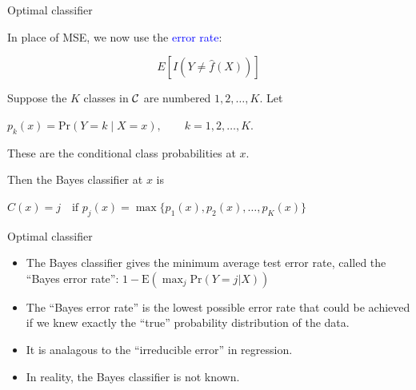 \documentclass[14pt]{beamer}
\begin{document}
\begin{frame}{Optimal classifier}

In place of MSE, we now use the \textcolor{blue}{error rate}:
\begin{block}{}
$$ E[I(Y \ne \hat{f}(X))] $$
\end{block} \pause
Suppose the $K$ classes in $\cal C$ are
numbered $1, 2, \dots, K$. Let
\begin{block}{}
\centerline{$
p_k(x) = \text{Pr}(Y = k\mid X = x),\qquad k = 1, 2, \dots , K.
$}
\end{block}
These are the \alert{conditional class probabilities} at $x$. \pause


Then the \alert{Bayes classifier} at $x$ is
\begin{block}{}
\centerline{$
C(x) = j\quad \text{if $p_j(x) = \max\{p_1(x), p_2(x), \dots, p_K(x)\}$}
$}
\end{block}

\end{frame}

\begin{frame}{Optimal classifier}
	
	
\begin{itemize}
\item The \alert{Bayes classifier} gives the minimum average test error rate, called the ``Bayes error rate'': $1-\text{E}\left(\max_j \text{Pr}(Y=j | X)\right)$

\item The ``Bayes error rate'' is the lowest possible error rate that could be achieved if we knew exactly the ``true'' probability distribution of the data.
\item It is analagous to the ``irreducible error'' in regression.
\item In reality, the \alert{Bayes classifier}  is not known.
\end{itemize}

\end{frame}
\end{document}
